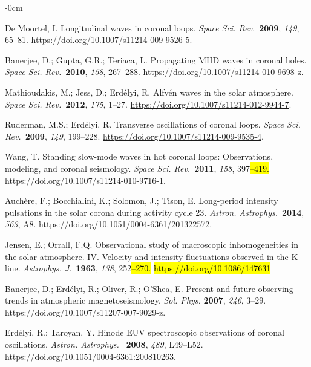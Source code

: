\documentclass[physics,article,accept,pdftex,moreauthors]{Definitions/mdpi}
\newcommand{\aap}{{\it Astron. Astrophys.}}
\newcommand{\apj}{{\it Astrophys. J.}}
\newcommand{\ssr}{{\it Space Sci. Rev.}}
\begin{document}
\begin{adjustwidth}{-\extralength}{0cm}
\begin{thebibliography}{999}
		 De Moortel, I. Longitudinal waves in coronal loops. \ssr~\textbf{2009}, \emph{149}, 
65--81. https://doi.org/10.1007/s11214-009-9526-5.
		
		 Banerjee, D.; Gupta, G.R.; Teriaca, L. Propagating MHD waves in coronal holes. \ssr~\textbf{2010}, \emph{158}, 267--288. https://doi.org/10.1007/s11214-010-9698-z.
		
		 Mathioudakis, M.; Jess, D.; Erd\'elyi, R. Alfv\'en waves in the solar 
atmosphere. \ssr~\textbf{2012}, \emph{175}, 1--27. {\url{https://doi.org/10.1007/s11214-012-9944-7}.} 
		
		 Ruderman, M.S.; Erd\'elyi, R. Transverse oscillations of coronal loops. 
\ssr~\textbf{2009}, \emph{149}, 199--228. {\url{https://doi.org/10.1007/s11214-009-9535-4}.}

 	 Wang, T. {Standing slow-mode waves in hot coronal loops: Observations, modeling, and coronal 
seismology}. \ssr~\textbf{2011}, \emph{158}, 397\hl{--419.}  https://doi.org/10.1007/s11214-010-9716-1.
		
		 Auchère, F.; Bocchialini, K.; Solomon, J.; Tison, E. Long-period intensity pulsations in the solar corona during activity cycle 23. \aap~\textbf{2014}, \emph{563}, A8. https://doi.org/10.1051/0004-6361/201322572.
		
		 Jensen, E.; Orrall, F.Q. Observational study of macroscopic inhomogeneities in the 
solar atmosphere. IV. Velocity and intensity fluctuations observed in the K line. \apj~\textbf{1963}, \emph{138}, 252\hl{--270.} 
 \hl{https://doi.org/10.1086/147631}
		
		 		Banerjee, D.; Erd\'elyi, R.; Oliver, R.; O’Shea, E. Present and future 
observing trends in atmospheric magnetoseismology. \emph{Sol. Phys.} \textbf{2007}, \emph{246}, 3--29. https://doi.org/10.1007/s11207-007-9029-z.
		
		 Erd\'elyi, R.; Taroyan, Y. Hinode EUV spectroscopic observations of coronal 
oscillations. \aap~ \textbf{2008}, \emph{489}, L49--L52. https://doi.org/10.1051/0004-6361:200810263.
		

\end{thebibliography}
\end{adjustwidth}
\end{document}
